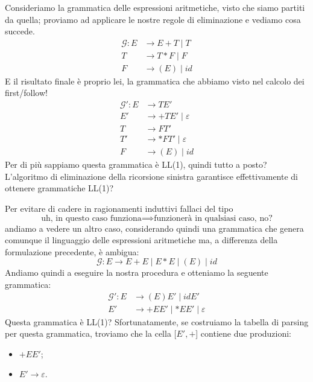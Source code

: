 \documentclass[class=book, crop=false, oneside, 12pt]{standalone}
\begin{document}
Consideriamo la grammatica delle espressioni aritmetiche, visto che siamo partiti da quella; proviamo ad applicare le nostre regole di eliminazione e vediamo cosa succede.
\begin{align*}
    \label{non-ll1_grammar}
    \mathcal{G}: E &\to E+T \mid T \\
    T &\to T*F \mid F \nonumber \\
    F &\to (E) \mid id \nonumber 
\end{align*}
E il risultato finale è proprio lei, la grammatica che abbiamo visto nel calcolo dei first/follow!
\begin{align*}
    \mathcal{G'}: E &\rightarrow TE' \\
    E' &\rightarrow +TE' \mid \varepsilon \\
    T &\rightarrow FT' \\
    T' &\rightarrow *FT' \mid \varepsilon \\
    F &\rightarrow (E) \mid id
\end{align*}
Per di più sappiamo questa grammatica è LL(1), quindi tutto a posto? L'algoritmo di eliminazione della ricorsione sinistra garantisce effettivamente di ottenere grammatiche LL(1)?

Per evitare di cadere in ragionamenti induttivi fallaci del tipo 
\begin{equation*}
    \textrm{uh, in questo caso funziona} \implies \textrm{funzionerà in qualsiasi caso, no?}
\end{equation*}
andiamo a vedere un altro caso, considerando quindi una grammatica che genera comunque il linguaggio delle espressioni aritmetiche ma, a differenza della formulazione precedente, è ambigua:
\begin{equation*}
    \mathcal{G}: E \to E + E \mid E * E \mid (E) \mid id
\end{equation*}
Andiamo quindi a eseguire la nostra procedura e otteniamo la seguente grammatica:
\begin{align*}
    \mathcal{G'}: E &\to (E)E' \mid idE' \\
    E' &\to +EE' \mid \ast EE' \mid \varepsilon
\end{align*}
Questa grammatica è LL(1)? Sfortunatamente, se costruiamo la tabella di parsing per questa grammatica, troviamo che la cella [\(E', +\)] contiene due produzioni:
\begin{itemize}[noitemsep]
    \item \(+EE'\);
    \item \(E' \to \varepsilon\).
\end{itemize}
\end{document}

